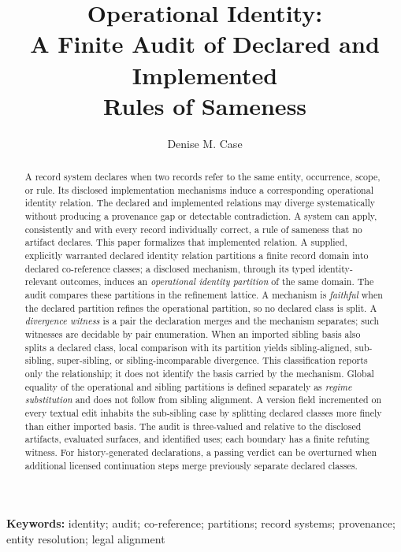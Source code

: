 \documentclass[11pt]{article}
\title{
Operational Identity:\\
A Finite Audit of Declared and Implemented\\
Rules of Sameness
}
\author{Denise M. Case}
\affil{\small School of Computer Science and Information Systems\\
Northwest Missouri State University, Maryville, MO, USA}
\date{}
\theoremstyle{plain}
\theoremstyle{definition}
\theoremstyle{remark}
\providecommand{\keywords}[1]{\vspace{0.5em}\noindent\textbf{Keywords: }\small #1}
\begin{document}
\maketitle
\vspace{-2em}

\begin{abstract}
  A record system declares when two records refer to the same entity, occurrence, scope, or rule.
  Its disclosed implementation mechanisms induce a corresponding operational identity relation.
  The declared and implemented relations may diverge systematically
  without producing a provenance gap or detectable contradiction.
  A system can apply, consistently and with every record individually correct,
  a rule of sameness that no artifact declares.
  This paper formalizes that implemented relation.
  A supplied, explicitly warranted declared identity relation partitions a finite record domain
  into declared co-reference classes;
  a disclosed mechanism, through its typed identity-relevant outcomes,
  induces an \emph{operational identity partition} of the same domain.
  The audit compares these partitions in the refinement lattice.
  A mechanism is \emph{faithful} when the declared partition refines the operational partition, so no declared class is split.
  A \emph{divergence witness} is a pair the declaration merges and the mechanism separates; such witnesses are decidable by pair enumeration.
  When an imported sibling basis also splits a declared class, local comparison with its partition yields sibling-aligned, sub-sibling, super-sibling, or sibling-incomparable divergence.
  This classification reports only the relationship; it does not identify the basis carried by the mechanism.
  Global equality of the operational and sibling partitions is defined separately as \emph{regime substitution} and does not follow from sibling alignment.
  A version field incremented on every textual edit inhabits the sub-sibling case by splitting declared classes more finely than either imported basis.
  The audit is three-valued and relative to the disclosed artifacts, evaluated surfaces, and identified uses; each boundary has a finite refuting witness.
  For history-generated declarations,
  a passing verdict can be overturned when additional licensed continuation steps
  merge previously separate declared classes.
\end{abstract}

\keywords{
  identity;
  audit;
  co-reference;
  partitions;
  record systems;
  provenance;
  entity resolution;
  legal alignment
}
\end{document}

